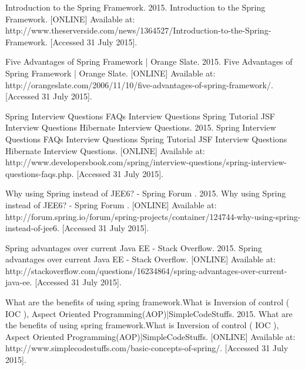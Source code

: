  Introduction to the Spring Framework. 2015. Introduction to the Spring Framework. [ONLINE] Available at: http://www.theserverside.com/news/1364527/Introduction-to-the-Spring-Framework. [Accessed 31 July 2015].
	
 Five Advantages of Spring Framework | Orange Slate. 2015. Five Advantages of Spring Framework | Orange Slate. [ONLINE] Available at: http://orangeslate.com/2006/11/10/five-advantages-of-spring-framework/. [Accessed 31 July 2015].
	
 Spring Interview Questions FAQs Interview Questions Spring Tutorial JSF Interview Questions Hibernate Interview Questions. 2015. Spring Interview Questions FAQs Interview Questions Spring Tutorial JSF Interview Questions Hibernate Interview Questions. [ONLINE] Available at: http://www.developersbook.com/spring/interview-questions/spring-interview-questions-faqs.php. [Accessed 31 July 2015].
	
 Why using Spring instead of JEE6? - Spring Forum . 2015. Why using Spring instead of JEE6? - Spring Forum . [ONLINE] Available at: http://forum.spring.io/forum/spring-projects/container/124744-why-using-spring-instead-of-jee6. [Accessed 31 July 2015].
	
 Spring advantages over current Java EE - Stack Overflow. 2015. Spring advantages over current Java EE - Stack Overflow. [ONLINE] Available at: http://stackoverflow.com/questions/16234864/spring-advantages-over-current-java-ee. [Accessed 31 July 2015].
	
 What are the benefits of using spring framework.What is Inversion of control ( IOC ), Aspect Oriented Programming(AOP)|SimpleCodeStuffs. 2015. What are the benefits of using spring framework.What is Inversion of control ( IOC ), Aspect Oriented Programming(AOP)|SimpleCodeStuffs. [ONLINE] Available at: http://www.simplecodestuffs.com/basic-concepts-of-spring/. [Accessed 31 July 2015].
	
